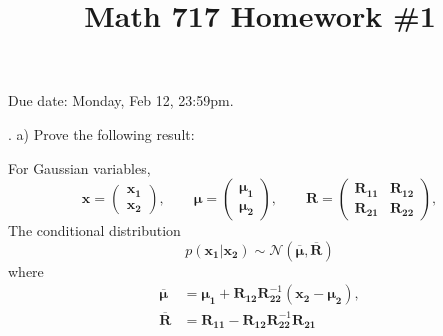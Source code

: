 \documentclass[a4paper,notitlepage,cs4size,cap,indent,oneside,12pt]{article}
\title{Math 717 Homework \#1}
\author{}
\date{}
\numberwithin{equation}{section}
\numberwithin{figure}{section}
\begin{document}
\maketitle%
Due date: Monday, Feb 12, 23:59pm.\medskip

. a) Prove the following result:

For Gaussian variables,
\begin{equation*}
    \mathbf{x} = \left(\begin{array}{cc} \mathbf{x}_{\mathbf{1}} \\ \mathbf{x}_{\mathbf{2}} \end{array}\right),\qquad\pmb{\mu} =\left(\begin{array}{cc} \boldsymbol{\mu}_{\mathbf{1}} \\ \boldsymbol{\mu}_{\mathbf{2}} \end{array}\right), \qquad \mathbf{R} = \left(\begin{array}{cc} \mathbf{R}_{\mathbf{11}} & \mathbf{R}_{\mathbf{12}} \\ \mathbf{R}_{\mathbf{21}} & \mathbf{R}_{\mathbf{22}} \end{array}\right),
\end{equation*}
The conditional distribution
\begin{equation*}
  p(\mathbf{x}_{\mathbf{1}}|\mathbf{x}_{\mathbf{2}}) \sim \mathcal{N}(\overline{\boldsymbol\mu}, \overline{\mathbf{R}})
\end{equation*}
where
\begin{equation*}
\begin{split}
  \overline{\boldsymbol{\mu}} &= \boldsymbol{\mu}_{\mathbf{1}} + \mathbf{R}_{\mathbf{12}}\mathbf{R}_{\mathbf{22}}^{-1}(\mathbf{x}_{\mathbf{2}} - \boldsymbol{\mu}_\mathbf{2}),\\
\overline{\mathbf{R}} &= \mathbf{R}_{\mathbf{11}} - \mathbf{R}_{\mathbf{12}}\mathbf{R}_{\mathbf{22}}^{-1}\mathbf{R}_{\mathbf{21}}
\end{split}
\end{equation*}
\end{document}
